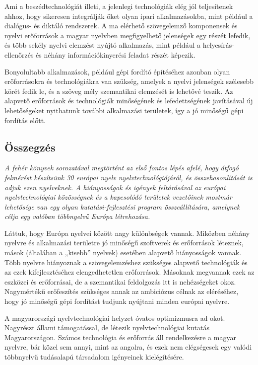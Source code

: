 \begin{multicols}{2}
  Ami a beszédtechnológiát illeti, a jelenlegi technológiák elég jól teljesítenek ahhoz, hogy sikeresen integrálják őket olyan ipari alkalmazásokba, mint például a dialógus- és diktáló rendszerek. A ma elérhető szövegelemző komponensek és nyelvi erőforrások a magyar nyelvben megfigyelhető jelenségek egy részét lefedik, és több sekély nyelvi elemzést nyújtó alkalmazás, mint például a helyesírás-ellenőrzés és néhány információkinyerési feladat részét képezik. 

  Bonyolultabb alkalmazások, például gépi fordító építéséhez azonban olyan erőforrásokra és technológiákra van szükség, amelyek a nyelvi jelenségek szélesebb körét fedik le, és a szöveg mély szemantikai elemzését is lehetővé teszik. Az alapvető erőforrások és technológiák minőségének és lefedettségének javításával új lehetőségeket nyithatunk további alkalmazási területek, így a jó minőségű gépi fordítás előtt.

  \subsection{Összegzés}

  \emph{A fehér könyvek sorozatával megtörtént az első fontos lépés afelé, hogy átfogó felmérést készítsünk 30 európai nyelv nyelvtechnológiájáról, és összehasonlítását is adjuk ezen nyelveknek. A hiányosságok és igények feltárásával az európai nyelvtechnológiai közösségnek és a kapcsolódó területek vezetőinek mostmár lehetősége van egy olyan kutatási-fejlesztési program összeállítására, amelynek célja egy valóban többnyelvű Európa létrehozása.}

  Láttuk, hogy Európa nyelvei között nagy különbségek vannak. Miközben néhány nyelvre és alkalmazási területre jó mi\-nő\-sé\-gű szoftverek és erőforrások léteznek, mások (általában a „kisebb” nyelvek) esetében alapvető hiányosságok vannak. Több nyelvre hiányoznak a szö\-veg\-elem\-zés\-hez szükséges alapvető technológiák és az ezek kifejlesztéséhez elengedhetetlen erőforrások. Másoknak megvannak ezek az eszközei és erőforrásai, de a szemantikai feldolgozás itt is nehézségeket okoz. Nagymértékű erőfeszítés szükséges annak az ambiciózus célnak az eléréséhez, hogy jó minőségű gépi fordítást tudjunk nyújtani minden európai nyelvre.

  A magyarországi nyelvtechnológiai helyzet óvatos optimizmusra ad okot. Nagyrészt állami támogatással, de létezik nyelvtechnológiai kutatás Magyarországon. Számos technológia és erőforrás áll rendelkezésre a magyar nyelvre, bár közel sem annyi, mint az angolra, és ezek nem elégségesek egy valódi többnyelvű tudásalapú társadalom igényeinek kielégítésére.


\end{multicols}
